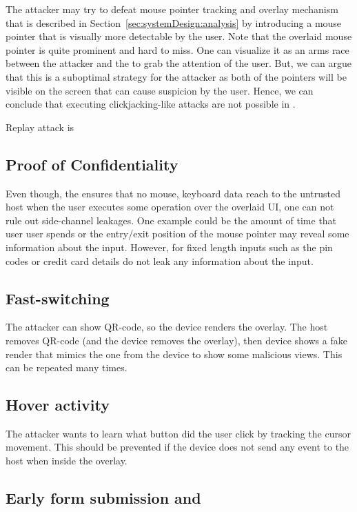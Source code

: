  The attacker may try to defeat \name mouse pointer tracking and overlay mechanism that is described in Section~\ref{sec:systemDesign:analysis} by introducing a mouse pointer that is visually more detectable by the user. Note that the \device overlaid mouse pointer is quite prominent and hard to miss. One can visualize it as an arms race between the attacker and the \device to grab the attention of the user. But, we can argue that this is a suboptimal strategy for the attacker as both of the pointers will be visible on the screen that can cause suspicion by the user. Hence, we can conclude that executing clickjacking-like attacks are not possible in \name.

 Replay attack is 

\subsection{Proof of Confidentiality}

 Even though, the \device ensures that no mouse, keyboard data reach to the untrusted host when the user executes some operation over the overlaid UI, one can not rule out side-channel leakages. One example could be the amount of time that user user spends or the entry/exit position of the mouse pointer may reveal some information about the input. However, for fixed length inputs such as the pin codes or credit card details do not leak any information about the input.

\subsection{Fast-switching}
The attacker can show QR-code, so the device renders the overlay. The host removes QR-code (and the device removes the overlay), then device shows a fake render that mimics the one from the device to show some malicious views. This can be repeated many times.

\subsection{Hover activity}
The attacker wants to learn what button did the user click by tracking the cursor movement. This should be prevented if the device does not send any event to the host when inside the overlay.

\subsection{Early form submission and }

